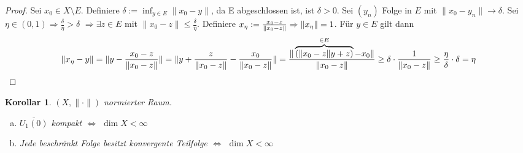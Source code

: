 \documentclass[ngerman]{report}
\theoremstyle{plain}%
\newtheorem{cor}[thm]{Korollar}
\theoremstyle{definition}%
\theoremstyle{myStyle}
\newcommand{\norm}[1]{\|#1\|}
\newcommand{\df}[1][]{%
	\overset{#1}{\Rightarrow}
}
\newcommand{\aq}{\Leftrightarrow} %
\newcommand{\spcm}[1][-0.8]{\vspace{#1 em}}
\begin{document}
	\begin{proof}
		Sei $x_0 \in X\setminus E$. Definiere $\delta := \inf_{y\in E} \norm{x_0 - y}$, da E abgeschlossen ist, ist $\delta > 0$. Sei $(y_n)$ Folge in $E$ mit $\norm{x_0 - y_n} \to \delta$. 
Sei $\eta \in (0,1) \df \frac{\delta}{\eta} > \delta $ $\df \exists z\in E$ mit $\norm{x_0 - z} \leq \frac{\delta}{\eta}.$ Definiere $\xt := \frac{x_0-z}{\norm{x_0 - z}} \df \norm{\xt} = 1$.
		Für $y\in E$ gilt dann 
		\spcm[-1.3]
		$$\norm{\xt - y} = \norm{y - \frac{x_0-z}{\norm{x_0 - z}}} 
		= \norm{y + \frac{z}{\norm{x_0 - z}} - \frac{x_0}{\norm{x_0 - z}}} 
		= \frac{\norm{\overbrace{(\norm{x_0 - z}y + z)}^{\in E} - x_0}}{\norm{x_0 - z}}  
		\geq \delta\cdot \frac{1}{\norm{x_0 - z}} \geq \frac{\eta}{\delta} \cdot \delta = \eta$$
	\end{proof}

	

	\begin{cor}
		$(X,\norm{\cdot})$ normierter Raum.
			\begin{enumerate}[a)] 
				\item $\overline{U_1(0)}$ kompakt $\aq$ $\dim X < \infty$
				\item Jede beschränkt Folge besitzt konvergente Teilfolge $\aq$ $\dim X < \infty$
			\end{enumerate}
	\end{cor}
\end{document}
